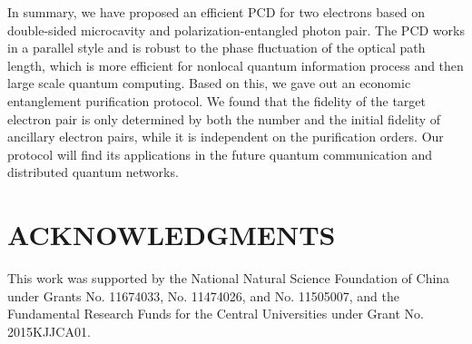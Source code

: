 \documentclass[aps,graphicx,twocolumn]{revtex4}%
\begin{document}
In summary, we have proposed an efficient PCD for two electrons based on double-sided microcavity and polarization-entangled photon  pair. The PCD works in a parallel style and is robust to the phase fluctuation of the optical path length, which is more efficient for nonlocal quantum information process and then large scale quantum computing. Based on this, we gave out an economic entanglement purification protocol. We found that the fidelity of the target electron pair is only determined by both the number and the initial fidelity of ancillary electron pairs, while it is independent on the purification orders. Our protocol will find its applications in the future quantum communication and distributed quantum networks.




\section*{ACKNOWLEDGMENTS}


This work was supported by the National Natural Science Foundation
of China under Grants No. 11674033, No.  11474026, and No. 11505007,
and the Fundamental Research Funds for the Central Universities
under Grant No. 2015KJJCA01.
\end{document}
